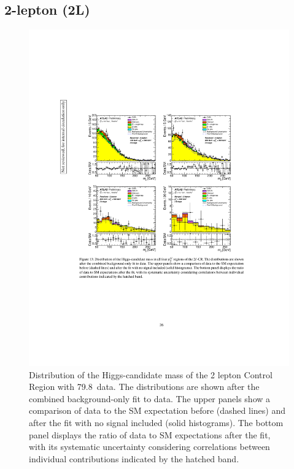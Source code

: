 \subsection{2-lepton (2L)}
\begin{figure}[H]
    \includegraphics[width=15cm, trim={4cm 9cm 4cm 6cm}, clip]{chapters/c9/figures/post-fit-2lep.pdf}
  \caption{Distribution of the Higgs-candidate mass of the 2 lepton Control Region with 79.8~\ifb data. 
  The distributions are shown after the combined background-only fit to data. 
  The upper panels show a comparison of data to the SM expectation before (dashed lines) and after the fit with no signal included (solid histograms). 
  The bottom panel displays the ratio of data to SM expectations after the fit, with its systematic uncertainty considering correlations between individual contributions indicated by the hatched band.}
  
  


  \label{fig:Data_MC_CR2_ll_m_jj_2b_postfit}
\end{figure}

